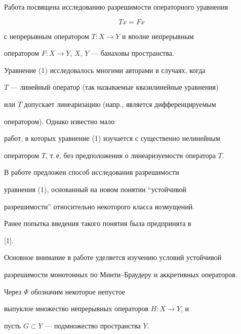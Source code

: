 \label{begin}





Работа посвящена исследованию разрешимости операторного уравнения


\begin{equation}


Tx=Fx


\end{equation}


с непрерывным оператором $T:X\to Y$ и вполне непрерывным 


оператором $F:X\to Y$, $X$, $Y$ --- банаховы пространства.





Уравнение (1) исследовалось многими авторами в случаях, когда


$T$ --- линейный оператор (так называемые квазилинейные уравнения) 


или $T$ допускает линеаризацию (напр., является дифференцируемым 


оператором). Однако известно мало


работ, в которых уравнение (1) изучается с существенно нелинейным 


оператором $T$, т.\,е. без предположения о линеаризуемости оператора $T$.





В работе предложен способ исследования разрешимости


уравнения (1), основанный на новом понятии ``устойчивой


разрешимости'' относительно некоторого класса возмущений.


Ранее попытка введения такого понятия была предпринята в


[1].





Основное внимание в работе уделяется изучению условий устойчивой 


разрешимости монотонных по Минти--Браудеру и аккретивных операторов.





Через $\Phi$ обозначим некоторое непустое


выпуклое множество непрерывных операторов $H:X\to Y$, и


пусть $G\subset Y$ --- подмножество пространства $Y$.






